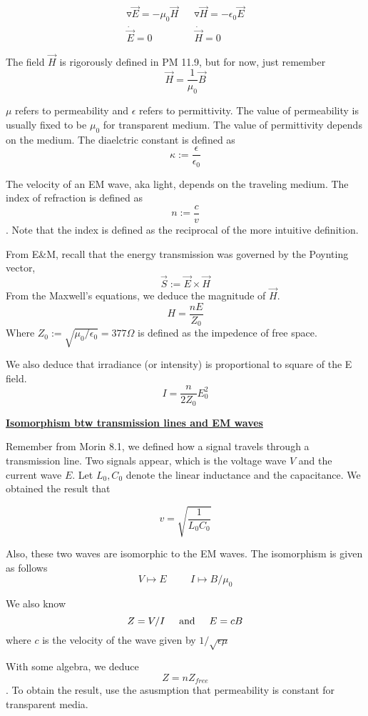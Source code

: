 \documentclass{article}
\newcommand{\new}[1]{
    \vspace{2mm}
    \noindent
    \textbf{
    \underline{#1}}
}
\newcommand{\textAnd}{
    {
        \hspace{5mm}
        \textrm{and}
        \hspace{5mm}
    }
}
\begin{document}
\begin{align*}
    \triangledown \vec{E} = -\mu_0 \vec{H}
    &&
    \triangledown \vec{H} = -\epsilon_0 \vec{E}
    \\
    \dot{\vec{E}} = 0 
    &&
    \dot{\vec{H}} = 0
\end{align*}

The field $\vec{H}$ is rigorously defined in PM 11.9, 
but for now, just remember 
\[
    \vec{H} = \frac 1 { \mu_0} \vec{B}
\]

$\mu$ refers to permeability and $\epsilon$ refers to 
permittivity. The value of permeability is usually 
fixed to be $\mu_0$ for transparent medium. The value of permittivity depends 
on the medium. The diaelctric constant is defined as 
\[
    \kappa := \frac \epsilon {\epsilon_0}
\]

The velocity of an EM wave, aka light, depends on the traveling 
medium. The index of refraction is defined as 
\[
    n := \frac c v
\]
. Note that the index is defined as the reciprocal of the 
more intuitive definition. 

From E\&M, recall that the energy transmission was governed 
by the Poynting vector, 
\[
    \vec{S} := \vec E \times \vec H
\]
From the Maxwell's equations, we deduce the magnitude of $\vec{H}$. 
\[
    H = \frac {nE}{Z_0}
\]
Where $Z_0 := \sqrt{\mu_0/\epsilon_0} = 377 \Omega$ is defined 
as the impedence of free space. 

We also deduce that irradiance (or intensity) is proportional 
to square of the E field. 
\[
    I = \frac n {2Z_0} E_0^2
\]

\new{Isomorphism btw transmission lines and EM waves} 

Remember from Morin 8.1, we defined how a signal travels through 
a transmission line. Two signals appear, which is the voltage wave 
$V$ and the current wave $E$. Let $L_0, C_0$ denote 
the linear inductance and the capacitance. We obtained the result that 

\[
    v = \sqrt{\frac 1 {L_0 C_0}}
\]

Also, these two waves are isomorphic to the EM waves. The isomorphism 
is given as follows 
\[
    V \mapsto E \hspace{1cm} I \mapsto B / \mu_0 
\]

We also know 
\[
    Z = V/I \textAnd E = cB 
\]
where $c$ is the velocity of the wave given by $1/\sqrt{\epsilon \mu}$

With some algebra, we deduce 
\[
    Z = n Z_{free}
\]
. To obtain the result, use the asusmption that permeability is 
constant for transparent media. 
\end{document}
